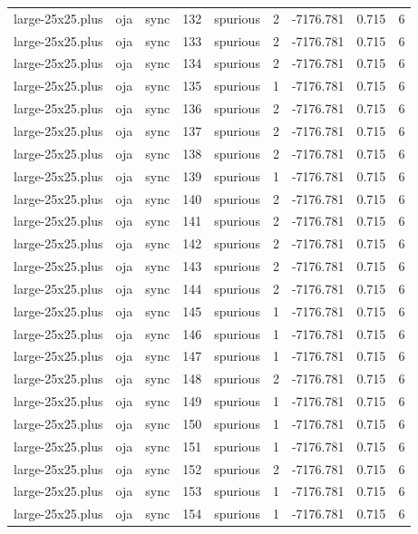 \begin{tabular}{lllrlrrrr}
large-25x25.plus & oja & sync & 132 & spurious & 2 & -7176.781 & 0.715 & 6 \\
large-25x25.plus & oja & sync & 133 & spurious & 2 & -7176.781 & 0.715 & 6 \\
large-25x25.plus & oja & sync & 134 & spurious & 2 & -7176.781 & 0.715 & 6 \\
large-25x25.plus & oja & sync & 135 & spurious & 1 & -7176.781 & 0.715 & 6 \\
large-25x25.plus & oja & sync & 136 & spurious & 2 & -7176.781 & 0.715 & 6 \\
large-25x25.plus & oja & sync & 137 & spurious & 2 & -7176.781 & 0.715 & 6 \\
large-25x25.plus & oja & sync & 138 & spurious & 2 & -7176.781 & 0.715 & 6 \\
large-25x25.plus & oja & sync & 139 & spurious & 1 & -7176.781 & 0.715 & 6 \\
large-25x25.plus & oja & sync & 140 & spurious & 2 & -7176.781 & 0.715 & 6 \\
large-25x25.plus & oja & sync & 141 & spurious & 2 & -7176.781 & 0.715 & 6 \\
large-25x25.plus & oja & sync & 142 & spurious & 2 & -7176.781 & 0.715 & 6 \\
large-25x25.plus & oja & sync & 143 & spurious & 2 & -7176.781 & 0.715 & 6 \\
large-25x25.plus & oja & sync & 144 & spurious & 2 & -7176.781 & 0.715 & 6 \\
large-25x25.plus & oja & sync & 145 & spurious & 1 & -7176.781 & 0.715 & 6 \\
large-25x25.plus & oja & sync & 146 & spurious & 1 & -7176.781 & 0.715 & 6 \\
large-25x25.plus & oja & sync & 147 & spurious & 1 & -7176.781 & 0.715 & 6 \\
large-25x25.plus & oja & sync & 148 & spurious & 2 & -7176.781 & 0.715 & 6 \\
large-25x25.plus & oja & sync & 149 & spurious & 1 & -7176.781 & 0.715 & 6 \\
large-25x25.plus & oja & sync & 150 & spurious & 1 & -7176.781 & 0.715 & 6 \\
large-25x25.plus & oja & sync & 151 & spurious & 1 & -7176.781 & 0.715 & 6 \\
large-25x25.plus & oja & sync & 152 & spurious & 2 & -7176.781 & 0.715 & 6 \\
large-25x25.plus & oja & sync & 153 & spurious & 1 & -7176.781 & 0.715 & 6 \\
large-25x25.plus & oja & sync & 154 & spurious & 1 & -7176.781 & 0.715 & 6 \\

\end{tabular}
